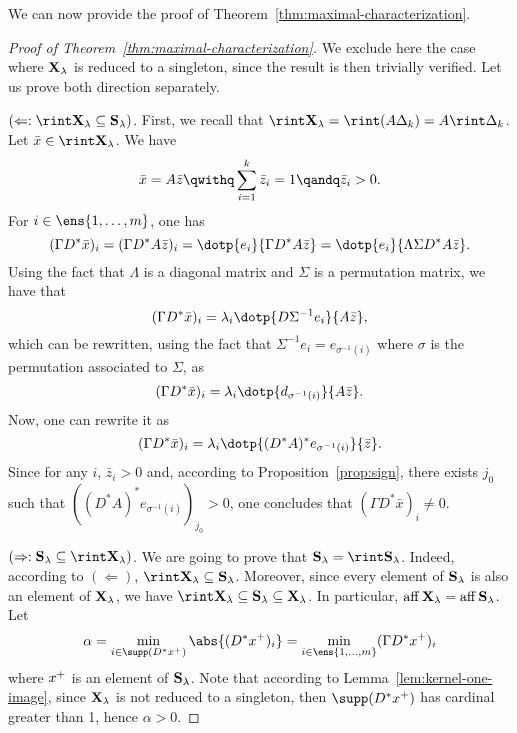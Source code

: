 We can now provide the proof of Theorem~\ref{thm:maximal-characterization}.
\begin{proof}[Proof of Theorem~\ref{thm:maximal-characterization}]
  We exclude here the case where $\mathbf{X}_{\lambda}$ is reduced to a singleton, since the result is then trivially verified.
  Let us prove both direction separately.

  $(\Leftarrow: \rint \Xl \subseteq \Sl)$.
  First, we recall that $\rint \Xl = \rint (A \Delta_k) = A \rint \Delta_k$.
  Let $\bar{x} \in \rint \Xl$.
  We have
  \begin{equation*}
    \bar{x} = A \bar{z} \qwithq \sum_{i=1}^k \bar{z}_i = 1 \qandq \bar{z}_i > 0.
  \end{equation*}
  For $i \in \ens{1,\dots,m}$, one has
  \begin{equation*}
    (\Gamma D^* \bar{x})_i = (\Gamma D^* A \bar{z})_i = \dotp{e_i}{\Gamma D^* A \bar{z}} =  \dotp{e_i}{\Lambda \Sigma D^* A \bar{z}}.
  \end{equation*}
  Using the fact that $\Lambda$ is a diagonal matrix and $\Sigma$ is a permutation matrix, we have that
  \begin{equation*}
    (\Gamma D^* \bar{x})_i = \lambda_i \dotp{D \Sigma^{-1} e_i}{A \bar{z}} ,
  \end{equation*}
  which can be rewritten, using the fact that $\Sigma^{-1} e_i = e_{\sigma^{-1}(i)}$ where $\sigma$ is the permutation associated to $\Sigma$, as
  \begin{equation*}
    (\Gamma D^* \bar{x})_i = \lambda_i \dotp{d_{\sigma^{-1}(i)}}{A \bar{z}} .
  \end{equation*}
  Now, one can rewrite it as
  \begin{equation*}
    (\Gamma D^* \bar{x})_i = \lambda_i \dotp{(D^* A)^* e_{\sigma^{-1}(i)}}{\bar{z}} .
  \end{equation*}
  Since for any $i$, $\bar{z}_i > 0$ and, according to Proposition~\ref{prop:sign}, there exists $j_0$ such that $((D^* A)^* e_{\sigma^{-1}(i)})_{j_0} > 0$, one concludes that $(\Gamma D^* \bar{x})_i \neq 0$.

  $(\Rightarrow: \Sl \subseteq \rint \Xl)$.
  We are going to prove that $\Sl = \rint \Sl$.
  Indeed, according to $(\Leftarrow)$, $\rint \Xl \subseteq \Sl$.
  Moreover, since every element of $\mathbf{S}_{\lambda}$ is also an element of $\mathbf{X}_{\lambda}$, we have $\rint \Xl \subseteq \Sl \subseteq \Xl$.
  In particular, $\operatorname{aff} \mathbf{X}_{\lambda} = \operatorname{aff} \mathbf{S}_{\lambda}$.
  Let
  \begin{equation*}
    \alpha = \min_{i \in \supp(D^* \maxx)} \abs{(D^* \maxx)_i} = \min_{i \in \ens{1,\dots,m}} (\Gamma D^* \maxx)_i
  \end{equation*}
  where $x^+$ is an element of $\mathbf{S}_{\lambda}$.
  Note that according to Lemma~\ref{lem:kernel-one-image}, since $\mathbf{X}_{\lambda}$ is not reduced to a singleton, then $\supp(D^* \maxx)$ has cardinal greater than 1, hence $\alpha > 0$.


\end{proof}
